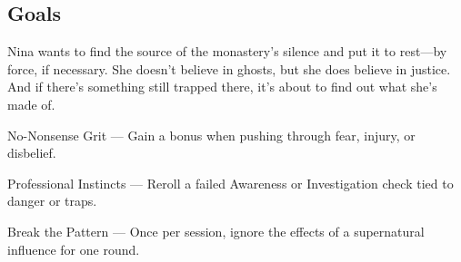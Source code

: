\documentclass[nodeprecatedcode,bg=print]{dndbook/dndbook}
\begin{document}
\begin{WyrdCharacterSheet}
    \subsection{Goals}
    Nina wants to find the source of the monastery’s silence and put it to rest—by force, if necessary. She doesn’t believe in ghosts, but she does believe in justice. And if there’s something still trapped there, it’s about to find out what she's made of.
  
    \begin{WyrdStatsBlock}[profile=img/characters/nina_maddox]
        \SkillsBox[%
            expert={Fight},%
            skilled={Awareness, Focus},%
            novice={Discipline, Investigation, Insight},%
        ]
  
        \begin{TraitsBox}
            \item[No-Nonsense Grit] — Gain a bonus when pushing through fear, injury, or disbelief.
            \item[Professional Instincts] — Reroll a failed Awareness or Investigation check tied to danger or traps.
            \item[Break the Pattern] — Once per session, ignore the effects of a supernatural influence for one round.
        \end{TraitsBox}
  
        \DamageBox[%
        ]
    \end{WyrdStatsBlock}
\end{WyrdCharacterSheet}
  
\end{document}

